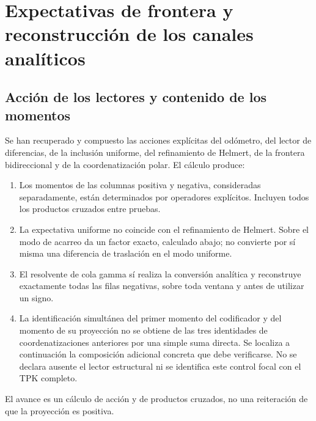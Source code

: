 \clearpage
\section[Expectativas de frontera y reconstrucción de los canales analíticos]{Expectativas de frontera y\\reconstrucción de los canales analíticos}
\label{sec:lectores-gamma}


\subsection{Acción de los lectores y contenido de los momentos}
\label{gamma-add-sub-5}

Se han recuperado y compuesto las acciones explícitas del odómetro, del lector de diferencias, de la inclusión uniforme, del refinamiento de Helmert, de la frontera bidireccional y de la coordenatización polar. El cálculo produce:

\begin{enumerate}
\item Los momentos de las columnas positiva y negativa, consideradas separadamente, están determinados por operadores explícitos. Incluyen todos los productos cruzados entre pruebas.
\item La expectativa uniforme no coincide con el refinamiento de Helmert. Sobre el modo de acarreo da un factor exacto, calculado abajo; no convierte por sí misma una diferencia de traslación en el modo uniforme.
\item El resolvente de cola gamma sí realiza la conversión analítica y reconstruye exactamente todas las filas negativas, sobre toda ventana y antes de utilizar un signo.
\item La identificación simultánea del primer momento del codificador y del momento de su proyección no se obtiene de las tres identidades de coordenatizaciones anteriores por una simple suma directa. Se localiza a continuación la composición adicional concreta que debe verificarse. No se declara ausente el lector estructural ni se identifica este control focal con el TPK completo.

\end{enumerate}
El avance es un cálculo de acción y de productos cruzados, no una reiteración de que la proyección es positiva.

